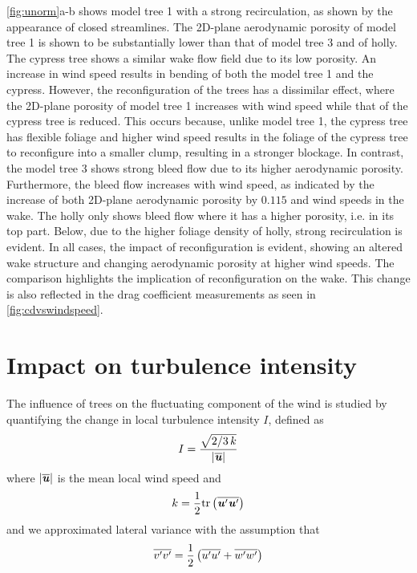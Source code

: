 \cref{fig:unorm}a-b shows model tree 1 with a strong recirculation, as shown by the appearance of closed streamlines. The 2D-plane aerodynamic porosity of model tree 1 is shown to be substantially lower than that of model tree 3 and of holly. The cypress tree shows a similar wake flow field due to its low porosity. An increase in wind speed results in bending of both the model tree 1 and the cypress. However, the reconfiguration of the trees has a dissimilar effect, where the 2D-plane porosity of model tree 1 increases with wind speed while that of the cypress tree is reduced. This occurs because, unlike model tree 1, the cypress tree has flexible foliage and higher wind speed results in the foliage of the cypress tree to reconfigure into a smaller clump, resulting in a stronger blockage. In contrast, the model tree 3 shows strong bleed flow due to its higher aerodynamic porosity. Furthermore, the bleed flow increases with wind speed, as indicated by the increase of both 2D-plane aerodynamic porosity by $0.115$ and wind speeds in the wake. The holly only shows bleed flow where it has a higher porosity, i.e. in its top part. Below, due to the higher foliage density of holly, strong recirculation is evident. In all cases, the impact of reconfiguration is evident, showing an altered wake structure and changing aerodynamic porosity at higher wind speeds. The comparison highlights the implication of reconfiguration on the wake. This change is also reflected in the drag coefficient measurements as seen in \cref{fig:cdvswindspeed}.

\section{Impact on turbulence intensity}

The influence of trees on the fluctuating component of the wind is studied by quantifying the change in local turbulence intensity $I$, defined as
\begin{equation}
I = \frac{\sqrt{2/3\,k}}{|\overline{\textbf{\textit{u}}}|}
\end{equation}	
where $|\overline{\textbf{\textit{u}}}|$ is the mean local wind speed and
\begin{equation}
k = \frac{1}{2} \mathrm{tr} \left(\overline{\textbf{\textit{u}}'\textbf{\textit{u}}'}\right)
\end{equation}
and we approximated lateral variance with the assumption that
\begin{equation}
\overline{v'v'} = \frac{1}{2}\left(\overline{u'u'} + \overline{w'w'}\right)
\end{equation}


